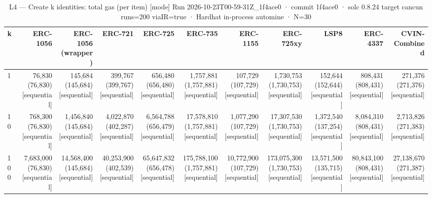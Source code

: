 \begin{table}[ht]
\centering
\small
\begin{tabular}{lrrrrrrrrrr}
\toprule
k & ERC-1056 & ERC-1056 (wrapper) & ERC-721 & ERC-725 & ERC-735 & ERC-1155 & ERC-725xy & LSP8 & ERC-4337 & CVIN-Combined \\
\midrule
1 & 76,830 (76,830) [sequential] & 145,684 (145,684) [sequential] & 399,767 (399,767) [sequential] & 656,480 (656,480) [sequential] & 1,757,881 (1,757,881) [sequential] & 107,729 (107,729) [sequential] & 1,730,753 (1,730,753) [sequential] & 152,644 (152,644) [sequential] & 808,431 (808,431) [sequential] & 271,376 (271,376) [sequential] \\
10 & 768,300 (76,830) [sequential] & 1,456,840 (145,684) [sequential] & 4,022,870 (402,287) [sequential] & 6,564,788 (656,479) [sequential] & 17,578,810 (1,757,881) [sequential] & 1,077,290 (107,729) [sequential] & 17,307,530 (1,730,753) [sequential] & 1,372,540 (137,254) [sequential] & 8,084,310 (808,431) [sequential] & 2,713,826 (271,383) [sequential] \\
100 & 7,683,000 (76,830) [sequential] & 14,568,400 (145,684) [sequential] & 40,253,900 (402,539) [sequential] & 65,647,832 (656,478) [sequential] & 175,788,100 (1,757,881) [sequential] & 10,772,900 (107,729) [sequential] & 173,075,300 (1,730,753) [sequential] & 13,571,500 (135,715) [sequential] & 80,843,100 (808,431) [sequential] & 27,138,670 (271,387) [sequential] \\
\bottomrule
\end{tabular}
\caption{L4 — Create k identities: total gas (per item) [mode] Run 2026-10-23T00-59-31Z\_1f4ace0 · commit 1f4ace0 · solc 0.8.24 target cancun runs=200 viaIR=true · Hardhat in-process automine · N=30}
\label{tab:batch}
\end{table}
